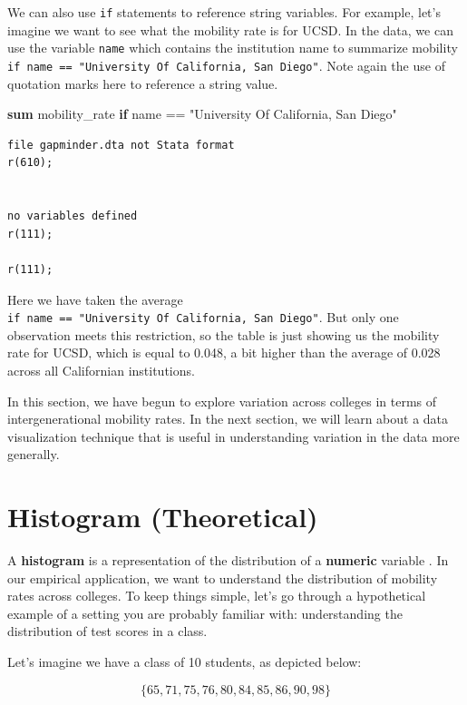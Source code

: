 \documentclass[
]{book}
\newenvironment{Shaded}{\begin{snugshade}}{\end{snugshade}}
\newcommand{\BaseNTok}[1]{\textcolor[rgb]{0.00,0.00,0.81}{#1}}
\newcommand{\KeywordTok}[1]{\textcolor[rgb]{0.13,0.29,0.53}{\textbf{#1}}}
\newcommand{\NormalTok}[1]{#1}
\newcommand{\StringTok}[1]{\textcolor[rgb]{0.31,0.60,0.02}{#1}}
\begin{document}
We can also use \texttt{if} statements to reference string variables. For example, let's imagine we want to see what the mobility rate is for UCSD. In the data, we can use the variable \texttt{name} which contains the institution name to summarize mobility \texttt{if\ name\ ==\ "University\ Of\ California,\ San\ Diego"}. Note again the use of quotation marks here to reference a string value.

\begin{Shaded}
\begin{Highlighting}[]
\KeywordTok{sum}\NormalTok{ mobility\_rate }\KeywordTok{if} \BaseNTok{name}\NormalTok{ == }\StringTok{"University Of California, San Diego"}
\end{Highlighting}
\end{Shaded}

\begin{verbatim}
file gapminder.dta not Stata format
r(610);


no variables defined
r(111);

r(111);
\end{verbatim}

Here we have taken the average \texttt{if\ name\ ==\ "University\ Of\ California,\ San\ Diego"}. But only one observation meets this restriction, so the table is just showing us the mobility rate for UCSD, which is equal to 0.048, a bit higher than the average of 0.028 across all Californian institutions.

In this section, we have begun to explore variation across colleges in terms of intergenerational mobility rates. In the next section, we will learn about a data visualization technique that is useful in understanding variation in the data more generally.

\section{Histogram (Theoretical)}\label{histogram-theoretical}

A \textbf{histogram} is a representation of the distribution of a \textbf{numeric} variable \medskip. In our empirical application, we want to understand the distribution of mobility rates across colleges. To keep things simple, let's go through a hypothetical example of a setting you are probably familiar with: understanding the distribution of test scores in a class.

Let's imagine we have a class of 10 students, as depicted below:

\[
  \{65,71,75,76,80,84,85,86,90,98\}
\]
\end{document}
